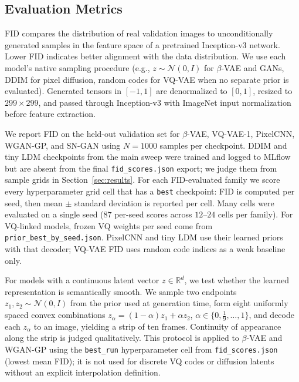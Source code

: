 \documentclass[cameraready]{Interspeech}
\begin{document}
\subsection{Evaluation Metrics}

\begin{description}[leftmargin=1.25em, labelsep=0.5em, itemsep=0.6em, topsep=0.4em]
\item[Fréchet Inception Distance (FID)]
FID \cite{heusel2017gans} compares the distribution of real validation images to unconditionally generated samples in the feature space of a pretrained Inception-v3 network. Lower FID indicates better alignment with the data distribution. We use each model's native sampling procedure (e.g., $z \sim \mathcal{N}(0,I)$ for $\beta$-VAE and GANs, DDIM for pixel diffusion, random codes for VQ-VAE when no separate prior is evaluated). Generated tensors in $[-1,1]$ are denormalized to $[0,1]$, resized to $299 \times 299$, and passed through Inception-v3 with ImageNet input normalization before feature extraction.

We report FID on the held-out validation set for $\beta$-VAE, VQ-VAE-1, PixelCNN, WGAN-GP, and SN-GAN using $N{=}1000$ samples per checkpoint. DDIM and tiny LDM checkpoints from the main sweep were trained and logged to MLflow but are absent from the final \texttt{fid\_scores.json} export; we judge them from sample grids in Section~\ref{sec:results}. For each FID-evaluated family we score every hyperparameter grid cell that has a \texttt{best} checkpoint: FID is computed per seed, then mean $\pm$ standard deviation is reported per cell. Many cells were evaluated on a single seed ($87$ per-seed scores across $12$--$24$ cells per family). For VQ-linked models, frozen VQ weights per seed come from \texttt{prior\_best\_by\_seed.json}. PixelCNN and tiny LDM use their learned priors with that decoder; VQ-VAE FID uses random code indices as a weak baseline only.

\item[Latent Interpolation Analysis]
For models with a continuous latent vector $z \in \mathbb{R}^d$, we test whether the learned representation is semantically smooth. We sample two endpoints $z_1, z_2 \sim \mathcal{N}(0,I)$ from the prior used at generation time, form eight uniformly spaced convex combinations
$z_\alpha = (1-\alpha) z_1 + \alpha z_2$, $\alpha \in \{0, \tfrac{1}{9}, \ldots, 1\}$,
and decode each $z_\alpha$ to an image, yielding a strip of ten frames. Continuity of appearance along the strip is judged qualitatively. This protocol is applied to $\beta$-VAE and WGAN-GP using the \texttt{best\_run} hyperparameter cell from \texttt{fid\_scores.json} (lowest mean FID); it is not used for discrete VQ codes or diffusion latents without an explicit interpolation definition.


\end{description}
\end{document}
